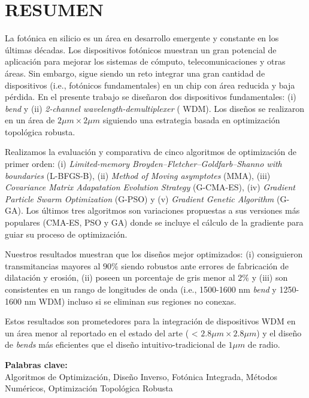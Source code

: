 \chapter*{\center \Large \vspace{-4.5cm} RESUMEN}

La fotónica en silicio es un área en desarrollo emergente y constante en los últimas décadas. Los dispositivos fotónicos muestran un gran potencial de aplicación para mejorar
los sistemas de cómputo, telecomunicaciones y otras áreas.
Sin embargo, sigue siendo un reto integrar una gran cantidad de dispositivos (i.e., fotónicos fundamentales) en un chip con área reducida y baja pérdida. 
En el presente trabajo se diseñaron dos dispositivos fundamentales: (i) \emph{bend} y (ii) \emph{2-channel wavelength-demultiplexer} ( WDM).
Los diseños se realizaron en un área de $2 \mu m \times 2 \mu m$
siguiendo una estrategia basada en optimización topológica robusta.

Realizamos la evaluación y comparativa de cinco algoritmos de optimización de primer orden: 
(i) \emph{Limited-memory Broyden–Fletcher–Goldfarb–Shanno with boundaries} (L-BFGS-B), 
(ii) \emph{Method of Moving asymptotes} (MMA), 
(iii) \emph{Covariance Matrix Adapatation Evolution Strategy} (G-CMA-ES), (iv) \emph{Gradient Particle Swarm Optimization} (G-PSO) y (v) \emph{Gradient Genetic Algorithm} (G-GA). Los últimos tres algoritmos son variaciones propuestas a sus versiones
más populares (CMA-ES, PSO y GA) donde se incluye el cálculo de
la gradiente para guiar su proceso de optimización.

Nuestros resultados muestran que los diseños mejor optimizados: (i) consiguieron transmitancias mayores al $90 \%$ siendo robustos ante errores
de fabricación de dilatación y erosión, (ii) poseen un porcentaje de gris menor al $2 \%$
y (iii) son consistentes en un rango de longitudes de onda (i.e., 1500-1600 nm \emph{bend} y 1250-1600 nm WDM) incluso si se eliminan sus regiones no conexas. 

Estos resultados son prometedores para la integración de dispositivos  WDM en un área menor al reportado en el estado del arte ( < $2.8 \mu m \times 2.8 \mu m$) y el diseño de \emph{bends} más eficientes que el diseño intuitivo-tradicional de $1 \mu m$ de radio.

\noindent \textbf{Palabras clave:}\\
\noindent Algoritmos de Optimización, Diseño Inverso, Fotónica Integrada, Métodos Numéricos, Optimización Topológica Robusta
